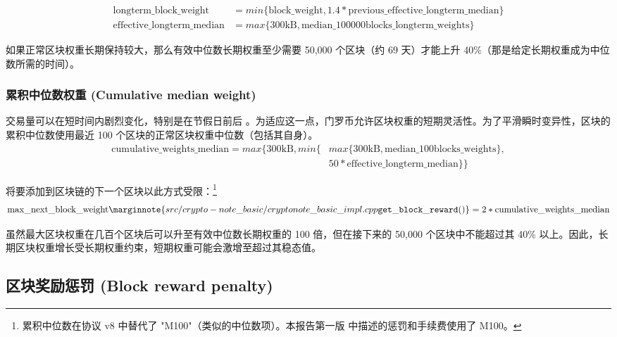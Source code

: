 \begin{align*}
    \textrm{longterm\_block\_weight} &= min\{\textrm{block\_weight}, 1.4*\textrm{previous\_effective\_longterm\_median}\}\\
    \textrm{effective\_longterm\_median} &= max\{\textrm{300kB}, \textrm{median\_100000blocks\_longterm\_weights}\}%
\end{align*}{}

如果正常区块权重长期保持较大，那么有效中位数长期权重至少需要 50,000 个区块（约 69 天）才能上升 40\%（那是给定长期权重成为中位数所需的时间）。


\subsubsection*{累积中位数权重 (Cumulative median weight)}

交易量可以在短时间内剧烈变化，特别是在节假日前后 \cite{visa-seasonality}。为适应这一点，门罗币允许区块权重的短期灵活性。为了平滑瞬时变异性，区块的累积中位数使用最近 100 个区块的正常区块权重中位数（包括其自身）。\vspace{.1cm}
\begin{align*}
    \textrm{cumulative\_weights\_median} = max\{\textrm{300kB}, min\{&max\{\textrm{300kB}, \textrm{median\_100blocks\_weights}\},\\
    &50*\textrm{effective\_longterm\_median}\}\}%
\end{align*}{}

将要添加到区块链的下一个区块以此方式受限：\footnote{累积中位数在协议 v8 中替代了 "M100"（类似的中位数项）。本报告第一版 \cite{ztm-1} 中描述的惩罚和手续费使用了 M100。}\vspace{.1cm}
\[\textrm{max\_next\_block\_weight}\marginnote{src/crypto- note\_basic/ cryptonote\_ basic\_ impl.cpp {\tt get\_block\_ reward()}} = 2*\textrm{cumulative\_weights\_median}\]%

虽然最大区块权重在几百个区块后可以升至有效中位数长期权重的 100 倍，但在接下来的 50,000 个区块中不能超过其 40\% 以上。因此，长期区块权重增长受长期权重约束，短期权重可能会激增至超过其稳态值。


\subsection{区块奖励惩罚 (Block reward penalty)}
\label{subsec:penalty}

